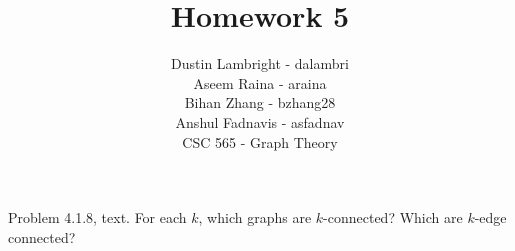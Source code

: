 \documentclass[12pt]{article}
\newenvironment{question}[2][Question]{\begin{trivlist}
\item[\hskip \labelsep {\bfseries #1}\hskip \labelsep {\bfseries #2.}]}{\end{trivlist}}
\begin{document}


\title{Homework 5}%
\author{Dustin Lambright - dalambri \\ Aseem Raina - araina \\ Bihan Zhang - bzhang28 \\ Anshul Fadnavis - asfadnav\\
CSC 565 - Graph Theory} %

\maketitle


\begin{question}{1}
Problem 4.1.8, text. For each $k$, which graphs are $k$-connected? Which are $k$-edge connected?
\end{question}

\noindent
\end{document}

